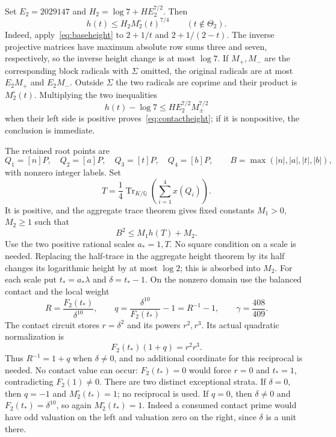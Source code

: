 \documentclass[11pt,a4paper]{article}
\newcommand{\Q}{\mathbb Q}\newcommand{\Z}{\mathbb Z}\newcommand{\HH}{\mathcal H}
\DeclareMathOperator{\Tr}{Tr}\DeclareMathOperator{\Nm}{Nm}
\begin{document}
Set $E_2=2029147$ and $H_2=\log7+HE_2^{7/2}$. Then
\begin{equation}\label{eq:contactheight}
                   h(t)\le H_2M_2^\circ(t)^{7/4}
                   \qquad(t\notin\Theta_2).
\end{equation}
Indeed, apply~\eqref{eq:baseheight} to $2+1/t$ and $2+1/(2-t)$.
The inverse projective matrices have maximum absolute row sums three
and seven, respectively, so the inverse height change is at most
$\log7$. If $M_+,M_-$ are the corresponding block radicals with
$\Sigma$ omitted, the original radicals are at most $E_2M_+$ and
$E_2M_-$. Outside $\Sigma$ the two radicals are coprime and their
product is $M_2^\circ(t)$. Multiplying the two inequalities
\[
              h(t)-\log7\le HE_2^{7/2}M_\pm^{7/2}
\]
when their left side is positive proves~\eqref{eq:contactheight};
if it is nonpositive, the conclusion is immediate.

The retained root points are
\[
 Q_1=[n]P,\quad Q_2=[a]P,\quad Q_3=[t]P,\quad Q_4=[b]P,
 \qquad B=\max(|n|,|a|,|t|,|b|),
\]
with nonzero integer labels. Set
\[
 T=\frac14\Tr_{K/\Q}\left(\sum_{i=1}^4x(Q_i)\right).
\]
It is positive, and the aggregate trace theorem gives fixed constants
$M_1>0$, $M_2\ge1$ such that
\begin{equation}\label{eq:aggregate}
                         B^2\le M_1h(T)+M_2.
\end{equation}
Use the two positive rational scales $a_*=1,T$. No square condition
on a scale is needed. Replacing the half-trace in the aggregate
height theorem by its half changes its logarithmic height by at
most $\log2$; this is absorbed into $M_2$.
For each scale put $t_*=a_*\lambda$ and $\delta=t_*-1$.
On the nonzero domain use the balanced contact and the local weight
\begin{equation}\label{eq:detector}
 R=\frac{F_2(t_*)}{\delta^{10}},\qquad
 q=\frac{\delta^{10}}{F_2(t_*)}-1=R^{-1}-1,
 \qquad \gamma=\frac{408}{409}.
\end{equation}
The contact circuit stores $r=\delta^2$ and its powers $r^2,r^3$.
Its actual quadratic normalization is
\begin{equation}\label{eq:clearing}
                         F_2(t_*)(1+q)=r^2r^3.
\end{equation}
Thus $R^{-1}=1+q$ when $\delta\ne0$, and no additional coordinate
for this reciprocal is needed. No contact value can occur:
$F_2(t_*)=0$ would force $r=0$ and $t_*=1$, contradicting $F_2(1)\ne0$.
There are two distinct exceptional strata. If $\delta=0$, then $q=-1$
and $M_2^\circ(t_*)=1$; no reciprocal is used. If $q=0$, then $\delta\ne0$
and $F_2(t_*)=\delta^{10}$, so again $M_2^\circ(t_*)=1$. Indeed a consumed
contact prime would have odd valuation on the left and valuation zero
on the right, since $\delta$ is a unit there.
\end{document}
